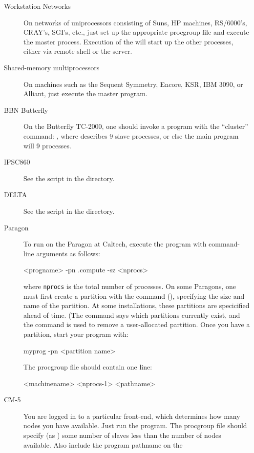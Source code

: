 \begin{description}
\item[Workstation Networks] On networks of uniprocessors consisting of Suns,
  HP machines, RS/6000's, CRAY's, SGI's, etc., just set up the appropriate
  procgroup file and execute the master process.  Execution of the
   will start up the other processes, either via
  remote shell or the server.
\item[Shared-memory multiprocessors]  On machines such as the Sequent
  Symmetry, Encore, KSR, IBM 3090, or Alliant, just execute the master program.
\item[BBN Butterfly] On the Butterfly TC-2000, one should invoke a program
  with the ``cluster'' command:  ,
  where  describes 9 slave processes, or else the main
  program will  9 processes.
\item[IPSC860] See the script  in the  directory. 
\item[DELTA] See the script  in the  directory. 
\item[Paragon] To run on the Paragon at Caltech, execute the program with
  command-line arguments as follows:
  \begin{example}
    <progname>  -pn .compute -sz <nprocs>
  \end{example}
where {\tt nprocs} is the total number of processes.  On some Paragons,
 one must first create a partition with
  the  command (),
  specifying the size and name of the partition.  At some installations, these
  partitions are specicified ahead of time.  (The  command says
  which partitions currently exist, and the  command is used to
  remove a user-allocated partition.  Once you have a partition, start your
  program with:
\begin{example}
  myprog -pn <partition name>  
\end{example}
  The procgroup file should contain one line:
\begin{example}
  <machinename> <nprocs-1> <pathname>    
\end{example}
\item[CM-5] You are logged in to a particular front-end, which determines how
  many nodes you have available.  Just run the program.  The procgroup file
  should specify (as ) some number of slaves less than the number
  of nodes available.  Also include the program pathname on the 

\end{description}
